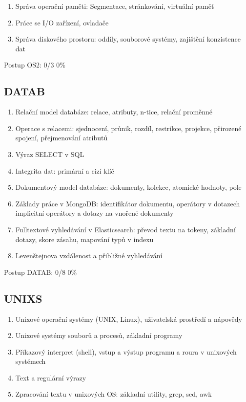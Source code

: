 \documentclass{article}
\begin{document}
	\begin{enumerate}[label=\arabic*.]
		\item Správa operační paměti: Segmentace, stránkování, virtuální paměť 
		\item Práce se I/O zařízení, ovladače
		\item Správa diskového prostoru: oddíly, souborové systémy, zajištění konzistence dat
	\end{enumerate}
	
	Postup OS2: 0/3 0\%
	
	\subsection*{DATAB}
	
	\begin{enumerate}[label=\arabic*.]
		\item Relační model databáze: relace, atributy, n-tice, relační proměnné
		\item Operace s relacemi: sjednocení, průnik, rozdíl, restrikce, projekce, přirozené spojení, přejmenování atributů
		\item Výraz SELECT v SQL
		\item Integrita dat: primární a cizí klíč
		\item Dokumentový model databáze: dokumenty, kolekce, atomické hodnoty, pole
		\item Základy práce v MongoDB: identifikátor dokumentu, operátory v dotazech implicitní operátory a dotazy na vnořené dokumenty
		\item Fulltextové vyhledávání v Elasticsearch: převod textu na tokeny, základní dotazy, skore zásahu, mapování typů v indexu
		\item Levenštejnova vzdálenost a přibližné vyhledávání
	\end{enumerate}
	
	Postup DATAB: 0/8 0\%
	
	\subsection*{UNIXS}
	
	\begin{enumerate}[label=\arabic*.]
		\item Unixové operační systémy (UNIX, Linux), uživatelská prostředí a nápovědy
		\item Unixové systémy souborů a procesů, základní programy
		\item Příkazový interpret (shell), vstup a výstup programu a roura v unixových systémech
		\item Text a regulární výrazy
		\item Zpracování textu v unixových OS: základní utility, grep, sed, awk
	\end{enumerate}
	
\end{document}
